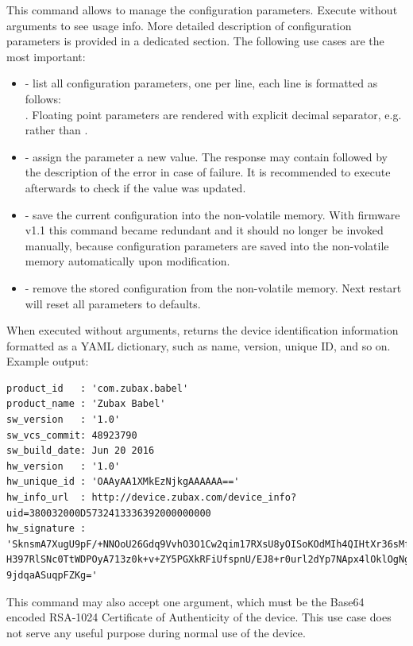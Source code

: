 \documentclass{zubaxdoc}
\begin{document}

This command allows to manage the configuration parameters. Execute without arguments to see usage info. More detailed description of configuration parameters is provided in a dedicated section. The following use cases are the most important:

\begin{itemize}
\item {} - list all configuration parameters, one per line, each line is formatted as follows:\\ . Floating point parameters are rendered with explicit decimal separator, e.g.   rather than .
\item {} - assign the parameter a new value. The response may contain  followed by the description of the error in case of failure. It is recommended to execute  afterwards to check if the value was updated.
\item {} - save the current configuration into the non-volatile memory. With firmware v1.1 this command became redundant and it should no longer be invoked manually,  because configuration parameters are saved into the non-volatile memory automatically upon modification.
\item {} - remove the stored configuration from the non-volatile memory. Next restart will reset all parameters to defaults.
\end{itemize}


When executed without arguments, returns the device identification information formatted as a YAML dictionary, such as name, version, unique ID, and so on. Example output:

\begin{verbatim}
product_id   : 'com.zubax.babel'
product_name : 'Zubax Babel'
sw_version   : '1.0'
sw_vcs_commit: 48923790
sw_build_date: Jun 20 2016
hw_version   : '1.0'
hw_unique_id : 'OAAyAA1XMkEzNjkgAAAAAA=='
hw_info_url  : http://device.zubax.com/device_info?uid=380032000D5732413336392000000000
hw_signature : 'SknsmA7XugU9pF/+NNOoU26Gdq9VvhO3O1Cw2qim17RXsU8yOISoKOdMIh4QIHtXr36sMfx
H397RlSNc0TtWDPOyA713z0k+v+ZY5PGXkRFiUfspnU/EJ8+r0url2dYp7NApx4lOklOgNgHrGCA6lPxA8UqoW
9jdqaASuqpFZKg='
\end{verbatim}

This command may also accept one argument, which must be the Base64 encoded RSA-1024 Certificate of Authenticity of the device. This use case does not serve any useful purpose during normal use of the device.
\clearpage
\end{document}
